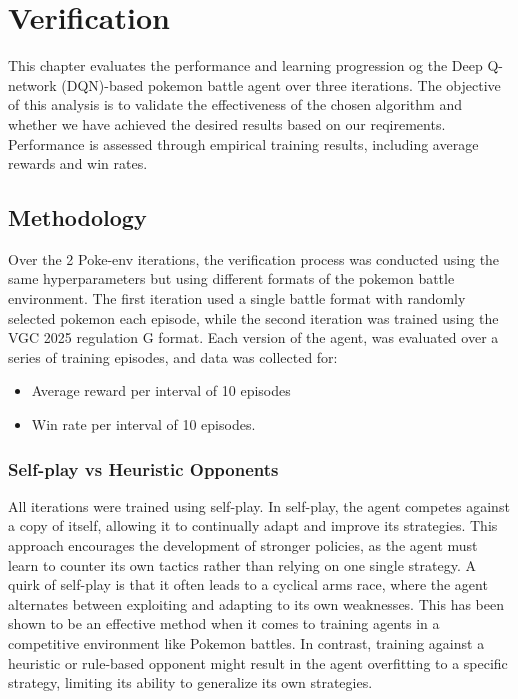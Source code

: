 \section{Verification}
\label{sec:verification}

This chapter evaluates the performance and learning progression og the Deep Q-network
(DQN)-based pokemon battle agent over three iterations. The objective of this analysis
is to validate the effectiveness of the chosen algorithm and whether we have achieved
the desired results based on our reqirements. Performance is assessed through empirical
training results, including average rewards and win rates.

\subsection{Methodology}
Over the 2 Poke-env iterations, the verification process was conducted using the same hyperparameters
but using different formats of the pokemon battle environment.
The first iteration used a single battle format with randomly selected pokemon each
episode, while the second iteration was trained using the VGC 2025 regulation G format.
Each version of the agent, was evaluated over a series of training episodes, and data
was collected for:
\begin{itemize}
    \item Average reward per interval of 10 episodes
    \item Win rate per interval of 10 episodes.
\end{itemize}

\subsubsection{Self-play vs Heuristic Opponents}
All iterations were trained using self-play. In self-play, the agent competes against a copy of itself, allowing it to 
continually adapt and improve its strategies. This approach encourages the development of stronger policies, as the agent 
must learn to counter its own tactics rather than relying on one single strategy. 
A quirk of self-play is that it often leads to a cyclical arms race, where the agent alternates between exploiting and adapting
to its own weaknesses. This has been shown to be an effective method when it comes to training agents in a competitive environment \cite{pmlr-v119-bai20a} like
Pokemon battles. In contrast, training against a heuristic or rule-based opponent might result in the agent overfitting to
a specific strategy, limiting its ability to generalize its own strategies.

